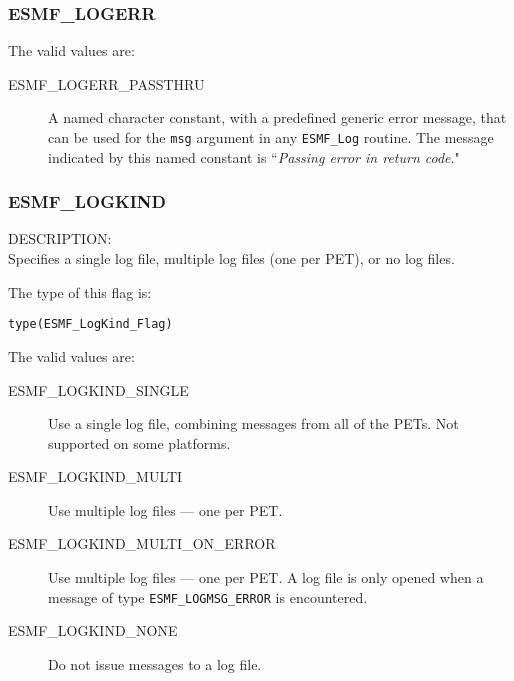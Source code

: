 

\subsubsection{ESMF\_LOGERR}
\label{const:logerr}

The valid values are:
\begin{description}
	\item [ESMF\_LOGERR\_PASSTHRU]
		A named character constant, with a predefined generic error message, 
		that can be used for the {\tt msg} argument in any {\tt ESMF\_Log} 
		routine.  The message indicated 
		by this named constant is ``{\it Passing error in return code}."
\end{description}

\subsubsection{ESMF\_LOGKIND}
\label{const:logkindflag}

{\sf DESCRIPTION:\\}
Specifies a single log file, multiple log files (one per PET), or no log files.

The type of this flag is:

{\tt type(ESMF\_LogKind\_Flag)}

The valid values are:
\begin{description}
   \item [ESMF\_LOGKIND\_SINGLE] 
         Use a single log file, combining messages from all of the PETs.  Not supported on some platforms.
   \item [ESMF\_LOGKIND\_MULTI]
         Use multiple log files --- one per PET.
   \item [ESMF\_LOGKIND\_MULTI\_ON\_ERROR]
         Use multiple log files --- one per PET.  A log file is only opened when a message
         of type {\tt ESMF\_LOGMSG\_ERROR} is encountered.
   \item [ESMF\_LOGKIND\_NONE]
         Do not issue messages to a log file.
\end{description}

